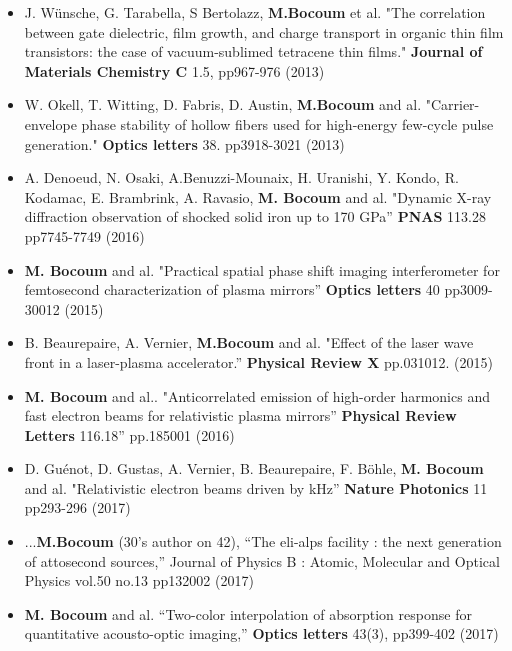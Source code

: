 \documentclass[11pt,a4paper,sans]{moderncv} %
\begin{document}
\begin{itemize}
\item J. Wünsche, G. Tarabella, S Bertolazz, \textbf{M.Bocoum} et al. "The correlation between gate dielectric, film growth, and charge transport in organic thin film transistors: the case of vacuum-sublimed tetracene thin films."  \textbf{Journal of Materials Chemistry C}  1.5, pp967-976  (2013) 

\item W. Okell, T. Witting, D. Fabris, D. Austin, \textbf{M.Bocoum} and al. "Carrier-envelope phase stability of hollow fibers used for high-energy few-cycle pulse generation." \textbf{Optics letters} 38. pp3918-3021 (2013)

\item A. Denoeud, N. Osaki, A.Benuzzi-Mounaix, H. Uranishi, Y. Kondo, R. Kodamac, E. Brambrink, A. Ravasio, \textbf{M. Bocoum} and al. "Dynamic X-ray diffraction observation of shocked solid iron up to 170 GPa” \textbf{PNAS} 113.28 pp7745-7749 (2016)

\item \textbf{M. Bocoum} and al. "Practical spatial phase shift imaging interferometer for femtosecond characterization of plasma mirrors” \textbf{Optics letters} 40 pp3009-30012 (2015)

\item B. Beaurepaire, A. Vernier, \textbf{M.Bocoum} and al. "Effect of the laser wave front in a laser-plasma accelerator.” \textbf{Physical Review X} pp.031012. (2015)

\item \textbf{M. Bocoum}  and al.. "Anticorrelated emission of high-order harmonics and fast electron beams for relativistic plasma mirrors”  \textbf{Physical Review Letters} 116.18” pp.185001  (2016)

\item  D. Guénot, D. Gustas, A. Vernier, B. Beaurepaire, F. Böhle, \textbf{M. Bocoum} and al. "Relativistic electron beams driven by kHz” \textbf{Nature Photonics} 11 pp293-296 (2017)

\item ...\textbf{M.Bocoum} (30's author on 42), “The eli-alps facility : the next generation of attosecond sources,” Journal of Physics B : Atomic, Molecular and Optical Physics vol.50 no.13 pp132002 (2017)

\item  \textbf{M. Bocoum} and al. “Two-color interpolation of absorption response for quantitative acousto-optic imaging,” \textbf{Optics letters} 43(3), pp399-402 (2017)


\end{itemize}
\end{document}
